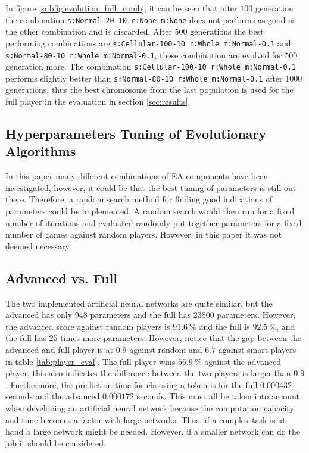 \documentclass{llncs}
\begin{document}
In figure \ref{subfig:evolution_full_comb}, it can be seen that after $100$ generation the combination \texttt{s:Normal-20-10 r:None m:None} does not performs as good as the other combination and is discarded. After $500$ generations the best performing combinations are \texttt{s:Cellular-100-10 r:Whole m:Normal-0.1} and \texttt{s:Normal-80-10 r:Whole m:Normal-0.1}, these combination are evolved for $500$ generation more. The combination \texttt{s:Cellular-100-10 r:Whole m:Normal-0.1} performs slightly better than \texttt{s:Normal-80-10 r:Whole m:Normal-0.1} after $1000$ generations, thus the best chromosome from the last population is used for the full player in the evaluation in section \ref{sec:results}.

\subsection{Hyperparameters Tuning of Evolutionary Algorithms}
In this paper many different combinations of EA components have been investigated, however, it could be that the best tuning of parameters is still out there. Therefore, a random search method for finding good indications of parameters could be implemented. A random search would then run for a fixed number of iterations and evaluated randomly put together parameters for a fixed number of games against random players. However, in this paper it was not deemed necessary.

\subsection{Advanced vs. Full}
The two implemented artificial neural networks are quite similar, but the advanced has only 948 parameters and the full has 23800 parameters. However, the advanced score against random players is $91.6\ \%$ and the full is $92.5\ \%$, and the full has $25$ times more parameters. However, notice that the gap between the advanced and full player is at $0.9$ against random and $6.7$ against smart players in table \ref{tab:player_eval}. The full player wins $56.9\ \%$ against the advanced player, this also indicates the difference between the two players is larger than $0.9$. Furthermore, the prediction time for choosing a token is for the full $0.000432$ seconds and the advanced $0.000172$ seconds. This must all be taken into account when developing an artificial neural network because the computation capacity and time becomes a factor with large networks. Thus, if a complex task is at hand a large network might be needed. However, if a smaller network can do the job it should be considered. 
\end{document}
